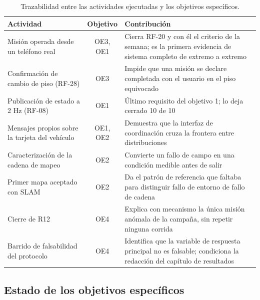 \documentclass[12pt,letterpaper]{article}
\begin{document}
\begin{table}[H]
    \centering
    \small
    \caption{Trazabilidad entre las actividades ejecutadas y los objetivos específicos.}
    \label{tab:trazabilidad}
    \begin{tabular}{@{}p{4.0cm}cp{7.6cm}@{}}
        \toprule
        \textbf{Actividad} & \textbf{Objetivo} & \textbf{Contribución} \\ \midrule
        Misión operada desde un teléfono real & OE3, OE1 & Cierra RF-20 y con él el criterio de la semana; es la primera evidencia de sistema completo de extremo a extremo \\ \addlinespace
        Confirmación de cambio de piso (RF-28) & OE3 & Impide que una misión se declare completada con el usuario en el piso equivocado \\ \addlinespace
        Publicación de estado a 2 Hz (RF-08) & OE1 & Último requisito del objetivo 1; lo deja cerrado 10 de 10 \\ \addlinespace
        Mensajes propios sobre la tarjeta del vehículo & OE1, OE2 & Demuestra que la interfaz de coordinación cruza la frontera entre distribuciones \\ \addlinespace
        Caracterización de la cadena de mapeo & OE2 & Convierte un fallo de campo en una condición medible antes de salir \\ \addlinespace
        Primer mapa aceptado con SLAM & OE2 & Da el patrón de referencia que faltaba para distinguir fallo de entorno de fallo de cadena \\ \addlinespace
        Cierre de R12 & OE4 & Explica con mecanismo la única misión anómala de la campaña, sin repetir ninguna corrida \\ \addlinespace
        Barrido de falsabilidad del protocolo & OE4 & Identifica que la variable de respuesta principal no es falsable; condiciona la redacción del capítulo de resultados \\ \bottomrule
    \end{tabular}
\end{table}

\subsection{Estado de los objetivos específicos}
\end{document}
